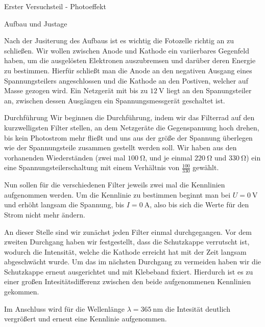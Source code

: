 \documentclass[pdftex, a4paper,11pt, twoside, ngerman]{report}
\begin{document}
\begin{chapter}{Erster Versuchsteil - Photoeffekt}
\begin{section}{Aufbau und Justage}
\begin{figure}[htbp]
\begin{center}
        \end{center}
      \end{figure}
      Nach der Jusiterung des Aufbaus ist es wichtig die Fotozelle richtig an zu schließen.
      Wir wollen zwischen Anode und Kathode ein variierbares Gegenfeld haben, um die ausgelösten Elektronen auszubremsen und darüber deren Energie zu bestimmen.
      Hierfür schließt man die Anode an den negativen Ausgang eines Spannungsteilers angeschlossen und die Kathode an den Postiven, welcher auf Masse gezogen wird.
      Ein Netzgerät mit bis zu $\SI{12}{\volt}$ liegt an den Spanungsteiler an, zwischen dessen Ausgängen ein Spannungsmessgerät geschaltet ist.
      
    \end{section}
    
      \begin{section}{Durchführung}
        \label{chp:Aufbau:sec:ERSTERTEIL:subsec:UNTERTEIL}
        Wir beginnen die Durchführung, indem wir das Filterrad auf den kurzwelligsten Filter stellen, an dem Netzgeräte die Gegenspannung hoch drehen, bis kein Photostrom mehr fließt und uns aus der größe der Spannung überlegen wie der Spannungsteile zusammen gestellt werden soll.
       Wir haben aus den vorhanenden Wiederständen (zwei mal $\SI{100}{\ohm}$, und je einmal $\SI{220}{\ohm}$ und $\SI{330}{\ohm}$) ein eine Spannungsteilerschaltung mit einem Verhältnis von $\frac{100}{330}$ gewählt.

       Nun sollen für die verschiedenen Filter jeweils zwei mal die Kennlinien aufgenommen werden.
       Um die Kennlinie zu bestimmen beginnt man bei $U=\SI{0}{\volt}$ und erhöht langsam die Spannung, bis $I=\SI{0}{\ampere}$, also bis sich die Werte für den Strom nicht mehr ändern.

       An dieser Stelle sind wir zunächst jeden Filter einmal durchgegangen.
       Vor dem zweiten Durchgang haben wir festgestellt, dass die Schutzkappe verrutscht ist, wodurch die Intensität, welche die Kathode erreicht hat mit der Zeit langsam abgeschwächt wurde.
       Um das im nächsten Durchgang zu vermeiden haben wir die Schutzkappe erneut ausgerichtet und mit Klebeband fixiert.
       Hierdurch ist es zu einer großen Intesitätsdifferenz zwischen den beide aufgenommenen Kennlinien gekommen.

       Im Anschluss wird für die Wellenlänge $\lambda = \SI{365}{\nano\meter}$ die Intesität deutlich vergrößert und erneut eine Kennlinie aufgenommen.  


\end{section}
\end{chapter}
\end{document}
